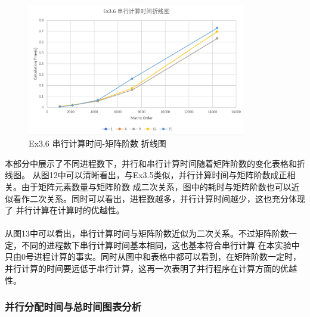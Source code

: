 \documentclass[UTF8]{article}
\begin{document}
        \begin{figure}[h]
            \centering
            \includegraphics[width=0.85\textwidth]{36sco.png}
            \caption{Ex3.6 串行计算时间-矩阵阶数 折线图}
        \end{figure}

        本部分中展示了不同进程数下，并行和串行计算时间随着矩阵阶数的变化表格和折线图。
        从图12中可以清晰看出，与Ex3.5类似，并行计算时间与矩阵阶数成正相关。由于矩阵元素数量与矩阵阶数
        成二次关系，图中的耗时与矩阵阶数也可以近似看作二次关系。同时可以看出，进程数越多，并行计算时间越少，这也充分体现了
        并行计算在计算时的优越性。\\\\
    
        从图13中可以看出，串行计算时间与矩阵阶数近似为二次关系。不过矩阵阶数一定，不同的进程数下串行计算时间基本相同，这也基本符合串行计算
        在本实验中只由0号进程计算的事实。同时从图中和表格中都可以看到，在矩阵阶数一定时，并行计算的时间要远低于串行计算，这再一次表明了并行程序在计算方面的优越性。
    







\clearpage
\subsubsection{并行分配时间与总时间图表分析}
\end{document}
